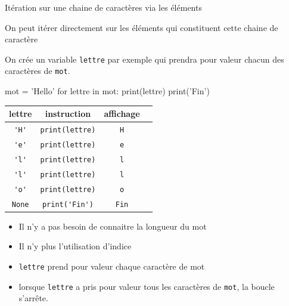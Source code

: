 	\begin{easybox}{Itération sur une chaine de caractères via les éléments}{}

	On peut itérer directement sur les éléments qui constituent cette chaine de caractère
	
	On crée un variable \verb+lettre+ par exemple qui prendra pour valeur chacun des caractères de \verb+mot+.
	
	\medskip
	
	\begin{minipage}{0.48\linewidth}
	\begin{CodePythontexAlt}[TaillePolice=\normalsize, Largeur=1\linewidth,Centre,PremLigne=1, Lignes=false,]{}
	mot = 'Hello'
	for lettre in mot:
		print(lettre)
	print('Fin')
	
		\end{CodePythontexAlt}
	\end{minipage}\hfill
	\begin{minipage}{0.48\linewidth}
		\begin{center}
			\renewcommand{\arraystretch}{1}
			\begin{tabular}{|c|c|c|c|}
				\hline
				lettre  & instruction & affichage \\ \hline{}
				\verb+'H'+  & \verb+print(lettre)+ & \verb+H+ \\ \hline{}
				\verb+'e'+  & \verb+print(lettre)+ & \verb+e+ \\ \hline{}
				\verb+'l'+  & \verb+print(lettre)+ & \verb+l+ \\ \hline{}
				\verb+'l'+  & \verb+print(lettre)+ & \verb+l+ \\ \hline{}
				\verb+'o'+  & \verb+print(lettre)+ & \verb+o+ \\ \hline{}
				\verb+None+  & \verb+print('Fin')+ & \verb+Fin+ \\ \hline
			\end{tabular}	
		\end{center}
	
	
	\end{minipage}
	\begin{itemize}
		\item Il n'y a pas besoin de connaitre la longueur du mot
		\item Il n'y  plus l'utilisation d'indice
		\item \verb+lettre+ prend pour valeur chaque caractère de mot
		\item lorsque \verb+lettre+ a pris pour valeur tous les caractères de \verb+mot+, la boucle s'arrête.
	\end{itemize}								
	\end{easybox}
	
